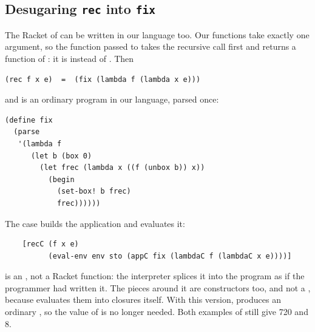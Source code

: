 \subsection{Desugaring \texttt{rec} into \texttt{fix}}

The Racket  of  can be written in our language too. Our functions take exactly one argument, so the function passed to  takes the recursive call first and returns a function of : it is  instead of . Then
\begin{lstlisting}
(rec f x e)  =  (fix (lambda f (lambda x e)))
\end{lstlisting}
and  is an ordinary program in our language, parsed once:
\begin{lstlisting}
(define fix
  (parse
   '(lambda f
      (let b (box 0)
        (let frec (lambda x ((f (unbox b)) x))
          (begin
            (set-box! b frec)
            frec))))))
\end{lstlisting}
The  case builds the application and evaluates it:
\begin{lstlisting}
    [recC (f x e)
          (eval-env env sto (appC fix (lambdaC f (lambdaC x e))))]
\end{lstlisting}
 is an , not a Racket function: the interpreter splices it into the program as if the programmer had written it. The pieces around it are  constructors too,  and not a , because  evaluates them into closures itself. With this version,  produces an ordinary , so the  value of  is no longer needed. Both examples of  still give 720 and 8.

